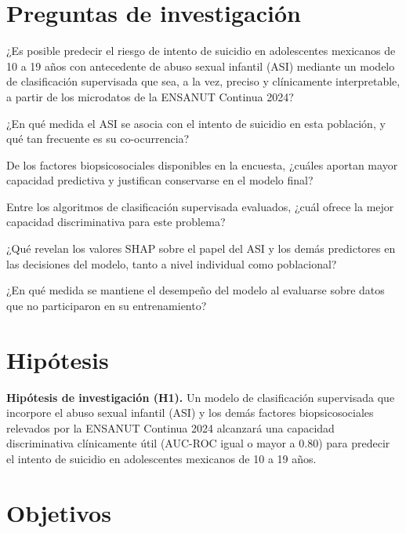 \section{Preguntas de investigación}
\label{sec:preguntas-investigacion}

\begin{description}[leftmargin=2.2cm,labelwidth=1.7cm]
  \item[RQ1.] ¿Es posible predecir el riesgo de intento de suicidio en adolescentes mexicanos de 10 a 19 años con antecedente de abuso sexual infantil (ASI) mediante un modelo de clasificación supervisada que sea, a la vez, preciso y clínicamente interpretable, a partir de los microdatos de la ENSANUT Continua 2024?
  \item[RQ1.1.] ¿En qué medida el ASI se asocia con el intento de suicidio en esta población, y qué tan frecuente es su co-ocurrencia?
  \item[RQ1.2.] De los factores biopsicosociales disponibles en la encuesta, ¿cuáles aportan mayor capacidad predictiva y justifican conservarse en el modelo final?
  \item[RQ1.3.] Entre los algoritmos de clasificación supervisada evaluados, ¿cuál ofrece la mejor capacidad discriminativa para este problema?
  \item[RQ1.4.] ¿Qué revelan los valores SHAP sobre el papel del ASI y los demás predictores en las decisiones del modelo, tanto a nivel individual como poblacional?
  \item[RQ1.5.] ¿En qué medida se mantiene el desempeño del modelo al evaluarse sobre datos que no participaron en su entrenamiento?
\end{description}

\section{Hipótesis}
\label{sec:hipotesis}

\noindent\textbf{Hipótesis de investigación (H1).} Un modelo de clasificación supervisada que incorpore el abuso sexual infantil (ASI) y los demás factores biopsicosociales relevados por la ENSANUT Continua 2024 alcanzará una capacidad discriminativa clínicamente útil (AUC-ROC igual o mayor a 0.80) para predecir el intento de suicidio en adolescentes mexicanos de 10 a 19 años.

\section{Objetivos}

